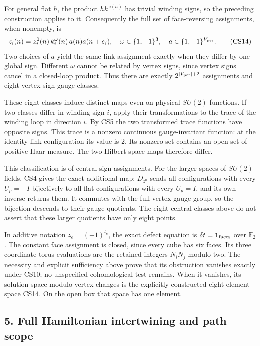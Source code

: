 \documentclass[11pt]{article}
\begin{document}
For general flat \(h\), the product \(hk^{\omega(h)}\) has trivial winding signs, so the preceding construction applies to it. Consequently the full set of face-reversing assignments, when nonempty, is
\[
 z_i(n)=z_i^0(n)\,k_i^\omega(n)\,a(n)a(n+e_i),
 \quad\omega\in\{1,-1\}^3,\quad a\in\{1,-1\}^{V_{\rm per}}.
 \tag{CS14}
\]
Two choices of \(a\) yield the same link assignment exactly when they differ by one global sign. Different \(\omega\) cannot be related by vertex signs, since vertex signs cancel in a closed-loop product. Thus there are exactly \(2^{|V_{\rm per}|+2}\) assignments and eight vertex-sign gauge classes.

These eight classes induce distinct maps even on physical \(SU(2)\) functions. If two classes differ in winding sign \(i\), apply their transformations to the trace of the winding loop in direction \(i\). By CS5 the two transformed trace functions have opposite signs. This trace is a nonzero continuous gauge-invariant function: at the identity link configuration its value is \(2\). Its nonzero set contains an open set of positive Haar measure. The two Hilbert-space maps therefore differ.

This classification is of central sign assignments. For the larger spaces of \(SU(2)\) fields, CS4 gives the exact additional map: \(D_{z^0}\) sends all configurations with every \(U_p=-I\) bijectively to all flat configurations with every \(U_p=I\), and its own inverse returns them. It commutes with the full vertex gauge group, so the bijection descends to their gauge quotients. The eight central classes above do not assert that these larger quotients have only eight points.

In additive notation \(z_e=(-1)^{t_e}\), the exact defect equation is \(\delta t=\mathbf1_{\rm faces}\) over \(\mathbb F_2\). The constant face assignment is closed, since every cube has six faces. Its three coordinate-torus evaluations are the retained integers \(N_iN_j\) modulo two. The necessity and explicit sufficiency above prove that its obstruction vanishes exactly under CS10; no unspecified cohomological test remains. When it vanishes, its solution space modulo vertex changes is the explicitly constructed eight-element space CS14. On the open box that space has one element.

\subsection*{5. Full Hamiltonian intertwining and path scope}
\end{document}
